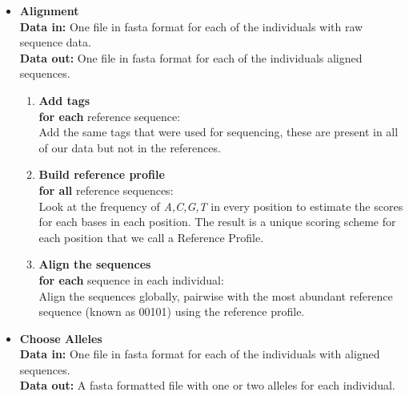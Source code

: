 \documentclass[a4paper,11pt]{kth-mag}
\begin{document}
\begin{itemize}
	\item \textbf{Alignment} \\
	
	\textbf{Data in:} One file in fasta format for each of the individuals with raw sequence data.\\
	\textbf{Data out:} One file in fasta format for each of the individuals aligned sequences.\\
	
	
	\begin{enumerate}
		\item \textbf{Add tags}\\ 
		\textbf{for each} reference sequence:\\
		Add the same tags that were used for sequencing, these are present in all of our data but not in the references.
		\item \textbf{Build reference profile}\\
		\textbf{for all} reference sequences:\\
		Look at the frequency of \emph{A,C,G,T} in every position to estimate the scores for each bases in each position.
		The result is a unique scoring scheme for each position that we call a Reference Profile.
		\item \textbf{Align the sequences}\\
		\textbf{for each} sequence in each individual:\\
		Align the sequences globally, pairwise with the most abundant reference sequence (known as 00101) using the reference profile.
	\end{enumerate}
	\item \textbf{Choose Alleles} \\ 
	
	\textbf{Data in:} One file in fasta format for each of the individuals with aligned sequences.\\
	\textbf{Data out:} A fasta formatted file with one or two alleles for each individual.\\
	

\end{itemize}
\end{document}
